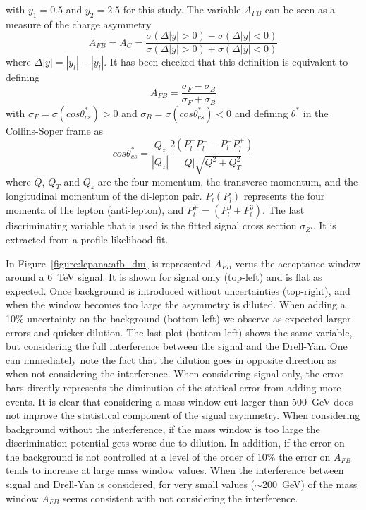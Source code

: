 with $y_1=0.5$ and $y_2=2.5$ for this study.
\newline
The variable $A_{FB}$ can be seen as a measure of the charge asymmetry
\begin{equation}
A_{FB} = A_C =  \frac{\sigma(\Delta|y| > 0) - \sigma(\Delta|y| < 0)}{\sigma(\Delta|y| > 0) + \sigma(\Delta|y| < 0)}
\end{equation}
where $\Delta|y| = |y_l| - |y_{\bar{l}}|$. It has been checked that this definition is equivalent to defining 
\begin{equation}
A_{FB} =   \frac{\sigma_F - \sigma_B}{\sigma_F + \sigma_B}
\end{equation}
with $\sigma_F = \sigma (cos\theta^{*}_{cs})>0$ and $\sigma_B = \sigma (cos\theta^{*}_{cs})<0$ and defining $\theta^*$ in the Collins-Soper 
frame as
\begin{equation}
cos\theta^{*}_{cs} =  \frac{Q_z}{|Q_z|} \frac{2(P_l^+P_{\bar{l}}^- - P_l^-P_{\bar{l}}^+)}{|Q| \sqrt{Q^2+Q^2_T}}
\end{equation}
where $Q$, $Q_T$ and $Q_z$ are the four-momentum, the transverse momentum, and the longitudinal
momentum of the di-lepton pair. $P_{l}(P_{\bar{l}})$ represents the four momenta of the lepton (anti-lepton),
and $P^\pm_l = (P^0_l \pm P^3_l)$.
\newline
The last discriminating variable that is used is the fitted signal cross section $\sigma_{Z'}$. It is extracted from a profile likelihood fit.

\label{subsubsection:opti}
In Figure~\ref{figure:lepana:afb_dm} is represented $A_{FB}$ verus the acceptance window around a 6~TeV signal. 
It is shown for signal only (top-left) and is flat as expected. Once background is introduced without uncertainties (top-right), and when the window 
becomes too large the asymmetry is diluted. When adding a 10\% uncertainty on the background (bottom-left) we observe as expected larger errors and quicker dilution.
The last plot (bottom-left) shows the same variable, but considering the full interference between the signal and the Drell-Yan. One can immediately 
note the fact that the dilution goes in opposite direction as when not considering the interference. 
When considering signal only, the error bars directly represents the diminution of the statical error from adding more events. It is clear that considering a mass window cut 
larger than 500~GeV does not improve the statistical component of the signal asymmetry. When considering background without the interference, if the mass window is too large 
the discrimination potential gets worse due to dilution. In addition, if the error on the background is not controlled at a level of the order of 10\% the error on $A_{FB}$ tends to 
increase at large mass window values. When the interference between signal and Drell-Yan is considered, for very small values ($\sim$200~GeV) of the mass window 
$A_{FB}$ seems consistent with not considering the interference. 


